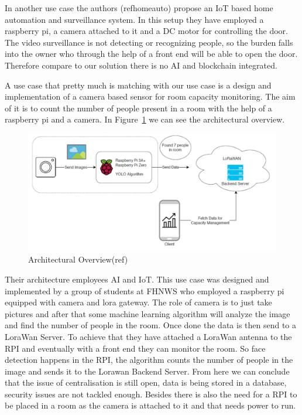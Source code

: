 In another use case the authors (refhomeauto) propose an IoT based home automation and surveillance system. In this setup they have employed a raspberry pi, a camera attached to it and a DC motor for controlling the door. The video surveillance is not detecting or recognizing people, so the burden falls into the owner who through the help of a front end will be able to open the door. Therefore compare to our solution there is no AI and blockchain integrated. 


A use case that pretty much is matching with our use case is a design and implementation of a camera based sensor for room capacity monitoring. The aim of it is to count the number of people present in a room with the help of a raspberry pi and a camera. In Figure~\ref{fig:raum} we can see the architectural overview. 

\begin{figure}[!htb]
    \centering
    \includegraphics[width=1\textwidth]{figures/raumbelegung.png}
    \caption{Architectural Overview(ref)}
    \label{fig:raum}
\end{figure}

Their architecture employees AI and IoT. This use case was designed and implemented by a group of students at FHNWS who employed a raspberry pi equipped with camera and lora gateway. The role of camera is to just take pictures and after that some machine learning algorithm will analyze the image and find the number of people in the room. Once done the data is then send to a LoraWan Server. To achieve that they have attached a LoraWan antenna to the RPI and eventually with a front end they can monitor the room. So face detection happens in the RPI, the algorithm counts the number of people in the image and sends it to the Lorawan Backend Server. From here we can conclude that the issue of centralisation is still open, data is being stored in a database, security issues are not tackled enough. Besides there is also the need for a RPI to be placed in a room as the camera is attached to it and that needs power to run. 

